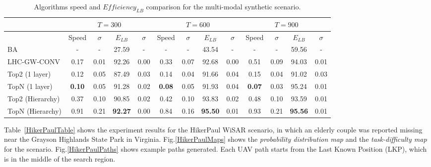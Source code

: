 \begin{center}
\begin{table*}[hbtp]
{
\scriptsize
\hfill{}
\setlength{\extrarowheight}{1.5pt}
\begin{tabular}
{|l|c|c|c|c|c|c|c|c|c|c|c|c|}
\hline
& \multicolumn{4}{|c|}{$T=300$} & \multicolumn{4}{|c|}{$T=600$} & \multicolumn{4}{|c|}{$T=900$} \\ 
\hline
& Speed & $\sigma$ & $\mathit{E_{LB}}$ & $\sigma$ & Speed & $\sigma$ & $\mathit{E_{LB}}$ & $\sigma$ & Speed & $\sigma$ & $\mathit{E_{LB}}$ & $\sigma$\\ 
\hline
BA & - & - & 27.59 & - & - & - & 43.54 & - & - & - & 59.56 & - \\ 
\hline
LHC-GW-CONV & 0.17 & 0.01 & 92.26 & 0.00 & 0.33 & 0.07 & 92.68 & 0.00 & 0.51 & 0.09 & 94.03 & 0.01 \\ 
\hline
Top2 (1 layer) & 0.12 & 0.05 & 87.49 & 0.03 & 0.14 & 0.04 & 91.66 & 0.04 & 0.15 & 0.04 & 91.02 & 0.03 \\ 
\hline
TopN (1 layer) & \textbf{0.10} & 0.05 & 91.28 & 0.02 & \textbf{0.08} & 0.05 & 91.93 & 0.04 & \textbf{0.07} & 0.03 & 95.24 & 0.01 \\ 
\hline
Top2 (Hierarchy) & 0.37 & 0.10 & 90.85 & 0.02 & 0.42 & 0.10 & 93.83 & 0.02 & 0.48 & 0.10 & 93.59 & 0.01  \\ 
\hline
TopN (Hierarchy) & 0.91 & 0.21 & \textbf{92.27} & 0.00 & 0.84 & 0.16 & \textbf{95.50} & 0.01 & 0.93 & 0.21 & \textbf{95.56} & 0.01 \\ 
\hline
\end{tabular}}
\medskip
\caption{Algorithms speed and $\mathit{Efficiency_{LB}}$ comparison for the multi-modal synthetic scenario.}
\label{TestCaseTable}
\vspace*{-5ex}
\end{table*}
\end{center}


Table~\ref{HikerPaulTable} shows the experiment results for the HikerPaul WiSAR scenario, in which an elderly couple was reported missing near the Grayson Highlands State Park in Virginia. Fig.\ref{HikerPaulMaps} shows the \textit{probability distribution map} and the \textit{task-difficulty map} for the scenario. Fig.\ref{HikerPaulPaths} shows example paths generated. Each UAV path starts from the Last Known Position (LKP), which is in the middle of the search region.


